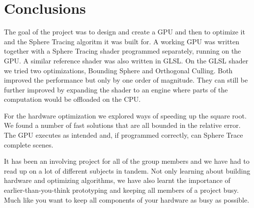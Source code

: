 \chapter{Conclusions}

	The goal of the project was to design and create a GPU and then to optimize
	it and the Sphere Tracing algoritm it was built for. A working GPU was
	written together with a Sphere Tracing shader programmed separately,
	running on the GPU. A similar reference shader was also written in GLSL. On
	the GLSL shader we tried two optimizations, Bounding Sphere and Orthogonal
	Culling. Both improved the performance but only by one order of magnitude.
	They can still be further improved by expanding the shader to an engine
	where parts of the computation would be offloaded on the CPU. 
	
	For the hardware optimization we explored ways of speeding up the square
	root. We found a number of fast solutions that are all bounded in the
	relative error. The GPU executes as intended and, if programmed correctly,
	can Sphere Trace complete scenes. 
	
	It has been an involving project for all of the group members and we have
	had to read up on a lot of different subjects in tandem. Not only learning
	about building hardware and optimizing algorithms, we have also learnt the
	importance of earlier-than-you-think prototyping and keeping all members of
	a project busy. Much like you want to keep all components of your hardware
	as busy as possible.
